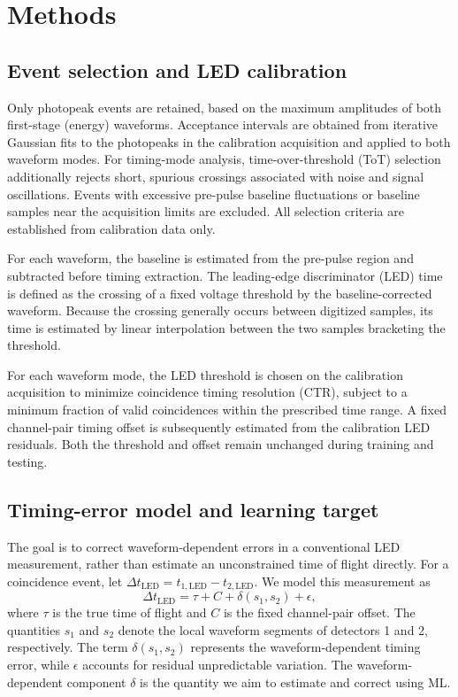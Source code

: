 \section{Methods}

\subsection{Event selection and LED calibration}

Only photopeak events are retained, based on the maximum amplitudes of both
first-stage (energy) waveforms. Acceptance intervals are obtained from iterative
Gaussian fits to the photopeaks in the calibration acquisition and applied to
both waveform modes. For timing-mode analysis, time-over-threshold (ToT)
selection additionally rejects short, spurious crossings associated with
noise and signal oscillations. Events with excessive pre-pulse baseline
fluctuations or baseline samples near the acquisition limits are excluded.
All selection criteria are established from calibration data only.

For each waveform, the baseline is estimated from the pre-pulse region and
subtracted before timing extraction. The leading-edge discriminator (LED)
time is defined as the crossing of a fixed voltage threshold by the
baseline-corrected waveform. Because the crossing generally occurs between
digitized samples, its time is estimated by linear interpolation between the
two samples bracketing the threshold.

For each waveform mode, the LED threshold is chosen on the calibration
acquisition to minimize coincidence timing resolution (CTR), subject to a
minimum fraction of valid coincidences within the prescribed time range.
A fixed channel-pair timing offset is subsequently estimated from the
calibration LED residuals. Both the threshold and offset remain unchanged
during training and testing.

\subsection{Timing-error model and learning target}
The goal is to correct waveform-dependent errors in a conventional LED
measurement, rather than estimate an unconstrained time of flight directly.
For a coincidence event, let
$\Delta t_{\mathrm{LED}}=t_{1,\mathrm{LED}}-t_{2,\mathrm{LED}}$.
We model this measurement as
\begin{equation}
\Delta t_{\mathrm{LED}}
=\tau+C+\delta(s_1,s_2)+\epsilon ,
\label{eq:led-error-model}
\end{equation}
where $\tau$ is the true time of flight and $C$ is the fixed
channel-pair offset. The quantities $s_1$ and $s_2$ denote the local
waveform segments of detectors 1 and 2, respectively. The term
$\delta(s_1,s_2)$ represents the waveform-dependent timing error,
while $\epsilon$ accounts for residual unpredictable variation.
The waveform-dependent component $\delta$ is the quantity we aim to estimate 
and correct using ML.

